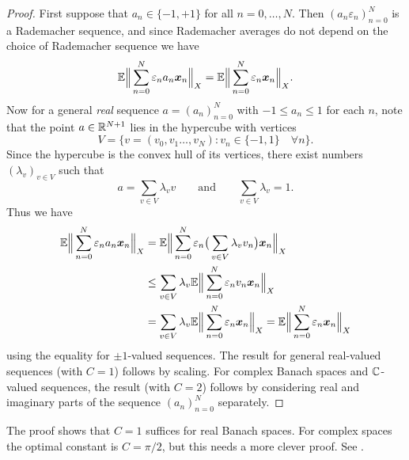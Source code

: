 \begin{proof}
  First suppose that $a_n \in \{-1,+1\}$ for all $n = 0, \ldots, N$.
  Then $(a_n \varepsilon_{n})_{n=0}^{N}$ is a Rademacher sequence, and since Rademacher averages do not depend on the choice of Rademacher sequence we have
  \begin{equation*}
    \mathbb{E} \Big\| \sum_{n = 0}^{N} \varepsilon_{n} a_{n} \bm{x}_{n} \Big\|_{X} = \mathbb{E} \Big\| \sum_{n = 0}^{N} \varepsilon_{n} \bm{x}_{n} \Big\|_{X}.
  \end{equation*}
  Now for a general \emph{real} sequence $a = (a_n)_{n=0}^{N}$ with $-1 \leq a_n \leq 1$ for each $n$, note that the point $a \in \mathbb{R}^{N+1}$ lies in the hypercube with vertices
  \begin{equation*}
    V = \{v = (v_{0}, v_{1}\ldots, v_{N}) : v_{n} \in \{-1,1\} \quad \forall n \}.
  \end{equation*}
  Since the hypercube is the convex hull of its vertices, there exist numbers $(\lambda_{v})_{v \in V}$ such that
  \begin{equation*}
    a = \sum_{v \in V} \lambda_{v} v \qquad \text{and} \qquad \sum_{v \in V} \lambda_{v} = 1.
  \end{equation*}
  Thus we have
  \begin{equation*}
    \begin{aligned}
    \mathbb{E} \Big\| \sum_{n = 0}^{N} \varepsilon_{n} a_{n} \bm{x}_{n} \Big\|_{X}
    &= \mathbb{E} \Big\| \sum_{n = 0}^{N} \varepsilon_{n} \big( \sum_{v \in V} \lambda_{v} v_{n} \big) \bm{x}_{n} \Big\|_{X} \\
    &\leq \sum_{v \in V} \lambda_{v} \mathbb{E} \Big\| \sum_{n = 0}^{N} \varepsilon_{n} v_{n} \bm{x}_{n} \Big\|_{X} \\
    &= \sum_{v \in V} \lambda_{v} \mathbb{E} \Big\| \sum_{n = 0}^{N} \varepsilon_{n} \bm{x}_{n} \Big\|_{X} 
    = \mathbb{E} \Big\| \sum_{n = 0}^{N} \varepsilon_{n} \bm{x}_{n} \Big\|_{X}
  \end{aligned}
\end{equation*}
using the equality for $\pm 1$-valued sequences.
The result for general real-valued sequences (with $C=1$) follows by scaling.
For complex Banach spaces and $\mathbb{C}$-valued sequences, the result (with $C=2$) follows by considering real and imaginary parts of the sequence $(a_n)_{n = 0}^{N}$ separately. 
\end{proof}

\begin{rmk}
  The proof shows that $C = 1$ suffices for real Banach spaces.
  For complex spaces the optimal constant is $C = \pi/2$, but this needs a more clever proof.
  See \cite[Proposition 3.2.10]{HNVW16}.
\end{rmk}

